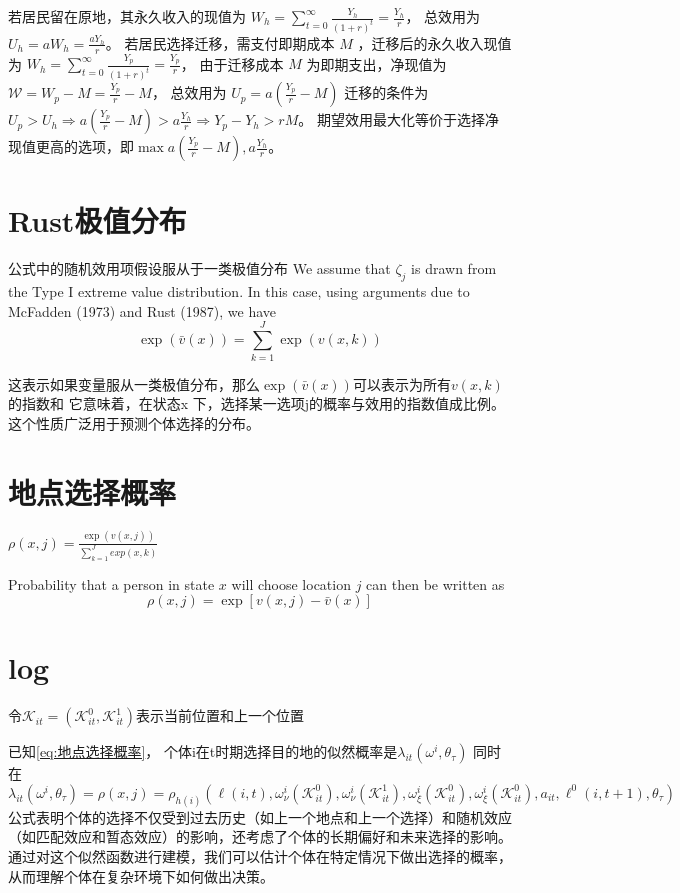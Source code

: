 \documentclass[a4paper,12pt,oneside, fontset=mac]{ctexbook} %
\begin{document}
若居民留在原地，其永久收入的现值为
$W_h = \sum\limits_{t=0}^\infty \frac{Y_h}{(1+r)^t}=\frac{Y_h}{r}$，
总效用为$U_h=a W_h = \frac{a Y_h}{r}$。
若居民选择迁移，需支付即期成本 
$M$
，迁移后的永久收入现值为
$W_h = \sum\limits_{t=0}^\infty \frac{Y_p}{(1+r)^t}=\frac{Y_p}{r}$，
由于迁移成本 
$M$
为即期支出，净现值为
$\mathcal{W}=W_p-M=\frac{Y_p}{r}-M$，
总效用为
$U_p=a(\frac{Y_p}{r}-M)$
迁移的条件为$U_p>U_h \Rightarrow a(\frac{Y_p}{r}-M) > a \frac{ Y_h}{r} \Rightarrow Y_p-Y_h > rM$。
期望效用最大化等价于选择净现值更高的选项，即$\max{a(\frac{Y_p}{r}-M), a \frac{ Y_h}{r}}$。

\chapter{Rust极值分布}
公式中的随机效用项假设服从于一类极值分布
We assume that $\zeta_j$ is drawn from the Type I extreme value distribution. In this case, using arguments due to McFadden (1973) and Rust (1987), we have
$$\exp\left(\bar{v}(x)\right) = \sum_{k=1}^J \exp\left(v(x, k)\right)$$

这表示如果变量服从一类极值分布，那么$\exp\left(\bar{v}(x)\right)$可以表示为所有$v(x, k)$的指数和
它意味着，在状态x 下，选择某一选项j的概率与效用的指数值成比例。
这个性质广泛用于预测个体选择的分布。

\chapter{地点选择概率}
$\rho(x,j)=\frac{\exp(v(x,j))}{\sum\limits_{k=1}^{J} exp(x,k)}$

Probability that a person in state $x$ will choose location $j$ can then be written as
$$\rho(x,j)=\exp[v(x,j)-\bar v(x)]$$

\chapter{log} %

令$\mathcal{K}_{it}=(\mathcal{K}_{it}^{0},\mathcal{K}_{it}^{1})$表示当前位置和上一个位置

已知\ref{eq:地点选择概率}，
个体i在t时期选择目的地的似然概率是$\lambda_{it}(\omega^{i},\theta_{\tau})$
同时在
\begin{equation}
  \lambda_{it}(\omega^{i},\theta_{\tau})=\rho(x,j)=\rho_{h(i)}(\ell(i,t),\omega_{\nu}^{i}(\mathcal{K}_{it}^{0}),\omega_{\nu}^{i}(\mathcal{K}_{it}^{1}),\omega_{\xi}^{i}(\mathcal{K}_{it}^{0}),\omega_{\xi}^{i}(\mathcal{K}_{it}^{0}),a_{it},\ell^{0}(i,t+1),\theta_{\tau})
\end{equation}
公式表明个体的选择不仅受到过去历史（如上一个地点和上一个选择）和随机效应（如匹配效应和暂态效应）的影响，还考虑了个体的长期偏好和未来选择的影响。
通过对这个似然函数进行建模，我们可以估计个体在特定情况下做出选择的概率，从而理解个体在复杂环境下如何做出决策。
\end{document}
